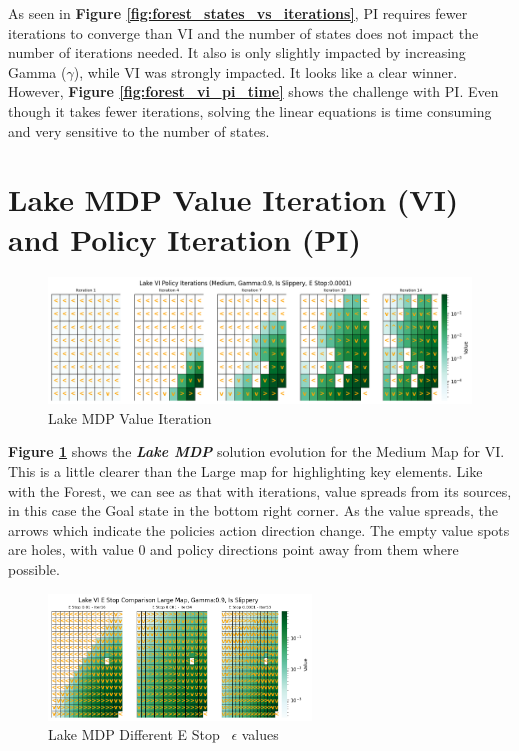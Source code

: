 \documentclass[letterpaper]{article} %
\begin{document}
As seen in \textbf{Figure \ref{fig:forest_states_vs_iterations}}, PI requires fewer iterations to converge than VI and the number of states does not impact the number of iterations needed.  It also is only slightly impacted by increasing Gamma ($\gamma$), while VI was strongly impacted.  It looks like a clear winner.  However,  \textbf{Figure \ref{fig:forest_vi_pi_time}} shows the challenge with PI.  Even though it takes fewer iterations, solving the linear equations is time consuming and very sensitive to the number of states.

\section{Lake MDP Value Iteration (VI) and Policy Iteration (PI)}


\begin{figure}[!htb]
\centering
\includegraphics[width=7in]{Figures/Lake_VI_Policy_Iterations_Medium__Gamma_0_9__Is_Slippery__E_Stop_0_0001_Iter_0_to_13_.png}
\caption{Lake MDP Value Iteration}
\label{fig:lake_vi}
\end{figure}

\textbf{Figure \ref{fig:lake_vi}} shows the \textbf{\emph{Lake MDP}} solution evolution for the Medium Map for VI.  This is a little clearer than the Large map for highlighting key elements.  Like with the Forest, we can see as that with iterations, value spreads from its sources, in this case the Goal state in the bottom right corner.  As the value spreads, the arrows which indicate the policies action direction change.  The empty value spots are holes, with value 0 and policy directions point away from them where possible.  


\begin{figure}[!htb]
\centering
\includegraphics[width=2.75in]{Figures/Lake_VI_E_Stop_Comparison_Large_Map__Gamma_0_9__Is_Slippery_gamma_0_01_to_0_0001_.png}
\caption{Lake MDP Different E Stop \ $\epsilon$ values}
\label{fig:lake_vi_estop}
\end{figure}
\end{document}
